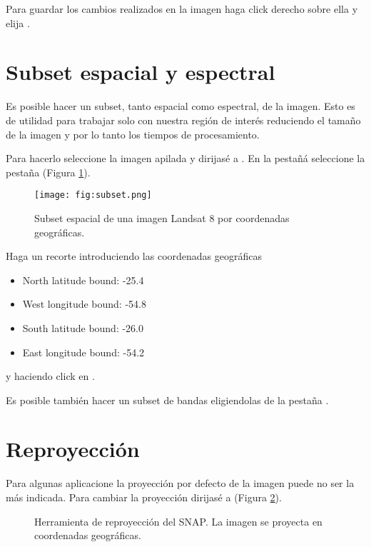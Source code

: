Para guardar los cambios realizados en la imagen haga click derecho sobre ella y elija .

\section{Subset espacial y espectral}
Es posible hacer un subset, tanto espacial como espectral, de la imagen. Esto es de utilidad para trabajar solo con nuestra región de interés reduciendo el tamaño de la imagen y por lo tanto los tiempos de procesamiento.

Para hacerlo seleccione la imagen apilada y dirijasé a . En la pestañá  seleccione la pestaña  (Figura \ref{fig:subset}).

\begin{figure}[h!]
    \centering
    \texttt{[image: fig:subset.png]}
    \caption{Subset espacial de una imagen Landsat 8 por coordenadas geográficas.}
    \label{fig:subset}
\end{figure}

Haga un recorte introduciendo las coordenadas geográficas

\begin{itemize}
    \item North latitude bound: -25.4
    \item West longitude bound: -54.8
    \item South latitude bound: -26.0
    \item East longitude bound: -54.2
\end{itemize}

y haciendo click en .

Es posible también hacer un subset de bandas eligiendolas de la pestaña .

\section{Reproyección}
Para algunas aplicacione la proyección por defecto de la imagen puede no ser la más indicada. Para cambiar la proyección dirijasé a  (Figura \ref{fig:repro}). 

\begin{figure}[h!]
    \centering
    \hspace{1cm}
    \caption{Herramienta de reproyección del SNAP. La imagen se proyecta en coordenadas geográficas.}
    \label{fig:repro}
\end{figure}

